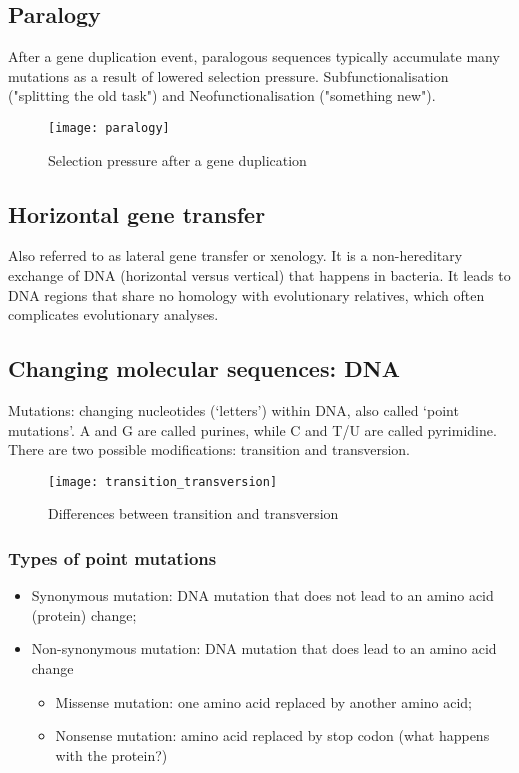 \subsection{Paralogy}

After a gene duplication event, paralogous sequences typically accumulate many 
mutations as a result of lowered selection pressure. Subfunctionalisation 
("splitting the old task") and Neofunctionalisation ("something new").

\begin{figure}
\centering
\texttt{[image: paralogy]}
\caption{Selection pressure after a gene duplication}
\label{Paralogy}
\end{figure}

\subsection{Horizontal gene transfer}

Also referred to as lateral gene transfer or xenology. It is a non-hereditary 
exchange of DNA (horizontal versus vertical) that happens in bacteria. 
It leads to DNA regions that share no homology with evolutionary relatives, which
often complicates evolutionary analyses.

\subsection{Changing molecular sequences: DNA}

Mutations: changing nucleotides (`letters') within DNA, also called `point
mutations'. A and G are called purines, while C and T/U are called pyrimidine.
There are two possible modifications: transition and transversion.

\begin{figure}
\centering
\texttt{[image: transition\_transversion]}
\caption{Differences between transition and transversion}
\label{Transition and Transversion}
\end{figure}

\subsubsection{Types of point mutations}

\begin{itemize}
\item Synonymous mutation: DNA mutation that does not lead to an amino acid
(protein) change;
\item Non-synonymous mutation: DNA mutation that does lead to an amino acid 
change
\begin{itemize}
\item Missense mutation: one amino acid replaced by another amino acid;
\item Nonsense mutation: amino acid replaced by stop codon (what happens with 
the protein?)
\end{itemize}
\end{itemize}

